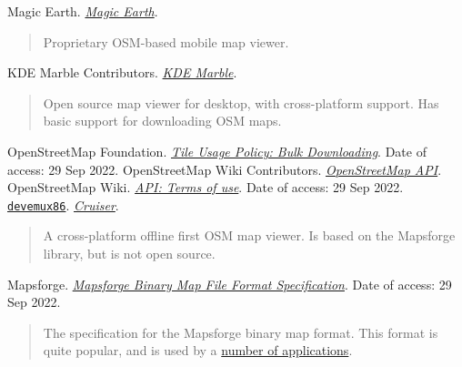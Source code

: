 \documentclass[]{final_report}
\begin{document}
\begin{thebibliography}{99}
\begin{quote}
\end{quote}
 Magic Earth. \emph{\href{https://www.magicearth.com/}{Magic Earth}}.
\begin{quote}
    Proprietary OSM-based mobile map viewer.
\end{quote}
 KDE Marble Contributors. \emph{\href{https://marble.kde.org/}{KDE Marble}}.
\begin{quote}
    Open source map viewer for desktop, with cross-platform support. Has basic support for downloading OSM maps.
\end{quote} 
 OpenStreetMap Foundation. \emph{\href{https://operations.osmfoundation.org/policies/tiles/\#bulk-downloading}{Tile Usage Policy: Bulk Downloading}}. Date of access: 29 Sep 2022.
 OpenStreetMap Wiki Contributors. \emph{\href{https://wiki.openstreetmap.org/wiki/API}{OpenStreetMap API}}.
 OpenStreetMap Wiki. \emph{\href{https://wiki.openstreetmap.org/wiki/API\#Terms_of_use}{API: Terms of use}}. Date of access: 29 Sep 2022.
 \href{https://devemux86.github.io/}{\texttt{devemux86}}. \emph{\href{https://wiki.openstreetmap.org/wiki/Cruiser}{Cruiser}}.
\begin{quote}
    A cross-platform offline first OSM map viewer. Is based on the Mapsforge library, but is not open source.
\end{quote}
 Mapsforge. \emph{\href{https://github.com/mapsforge/mapsforge/blob/master/docs/Specification-Binary-Map-File.md}{Mapsforge Binary Map File Format Specification}}. Date of access: 29 Sep 2022.
\begin{quote}
    The specification for the Mapsforge binary map format. This format is quite popular, and is used by a \href{https://github.com/mapsforge/mapsforge/blob/master/docs/Mapsforge-Applications.md}{number of applications}.
\end{quote}
\end{thebibliography}
\label{endpage}
\end{document}
